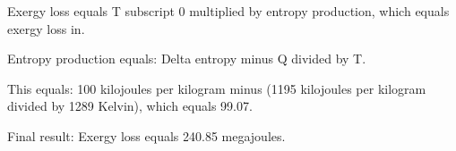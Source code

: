 Exergy loss equals T subscript 0 multiplied by entropy production, which equals exergy loss in.  

Entropy production equals:  
Delta entropy minus Q divided by T.  

This equals:  
100 kilojoules per kilogram minus (1195 kilojoules per kilogram divided by 1289 Kelvin), which equals 99.07.  

Final result:  
Exergy loss equals 240.85 megajoules.